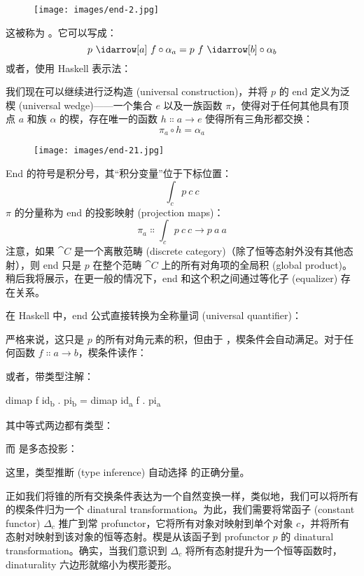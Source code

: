 \begin{figure}[H]
  \centering
  \texttt{[image: images/end-2.jpg]}
\end{figure}

\noindent
这被称为 。它可以写成：
\[p\ \idarrow[a]\ f \circ \alpha_a = p\ f\ \idarrow[b] \circ \alpha_b\]
或者，使用 Haskell 表示法：

我们现在可以继续进行泛构造 (universal construction)，并将 $p$ 的 end 定义为泛楔 (universal wedge)——一个集合 $e$ 以及一族函数 $\pi$，使得对于任何其他具有顶点 $a$ 和族 $\alpha$ 的楔，存在唯一的函数 $h \Colon a \to e$ 使得所有三角形都交换：
\[\pi_a \circ h = \alpha_a\]

\begin{figure}[H]
  \centering
  \texttt{[image: images/end-21.jpg]}
\end{figure}

\noindent
End 的符号是积分号，其“积分变量”位于下标位置：
\[\int_c p\ c\ c\]
$\pi$ 的分量称为 end 的投影映射 (projection maps)：
\[\pi_a \Colon \int_c p\ c\ c \to p\ a\ a\]
注意，如果 $\cat{C}$ 是一个离散范畴 (discrete category)（除了恒等态射外没有其他态射），则 end 只是 $p$ 在整个范畴 $\cat{C}$ 上的所有对角项的全局积 (global product)。稍后我将展示，在更一般的情况下，end 和这个积之间通过等化子 (equalizer) 存在关系。

在 Haskell 中，end 公式直接转换为全称量词 (universal quantifier)：

严格来说，这只是 $p$ 的所有对角元素的积，但由于 ，楔条件会自动满足。对于任何函数 $f \Colon a \to b$，楔条件读作：

或者，带类型注解：

\begin{snipv}
dimap f id\textsubscript{b} . pi\textsubscript{b} = dimap id\textsubscript{a} f . pi\textsubscript{a}
\end{snipv}
其中等式两边都有类型：

而  是多态投影：

这里，类型推断 (type inference) 自动选择  的正确分量。

正如我们将锥的所有交换条件表达为一个自然变换一样，类似地，我们可以将所有的楔条件归为一个 dinatural transformation。为此，我们需要将常函子 (constant functor) $\Delta_c$ 推广到常 profunctor，它将所有对象对映射到单个对象 $c$，并将所有态射对映射到该对象的恒等态射。楔是从该函子到 profunctor $p$ 的 dinatural transformation。确实，当我们意识到 $\Delta_c$ 将所有态射提升为一个恒等函数时，dinaturality 六边形就缩小为楔形菱形。

